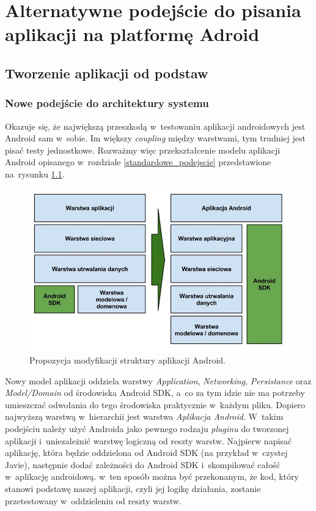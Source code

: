 \chapter{Alternatywne podejście do pisania aplikacji na platformę Adroid}
\label{propozycja_rozwiazania}

\section{Tworzenie aplikacji od podstaw}
\label{nowa_aplikacja}
\subsection{Nowe podejście do architektury systemu}
\label{clean_architecture}
Okazuje się, że największą przeszkodą w~testowaniu aplikacji androidowych jest Android sam w~sobie. Im większy \textit{coupling} między warstwami, tym trudniej jest pisać testy jednostkowe. Rozważmy więc przekształcenie modelu aplikacji Android opisanego w~rozdziale \ref{standardowe_podejscie} przedstawione na~rysunku \ref{fig:opis_rozwiazania}.

\begin{figure}[!htb]
    \centering
    \includegraphics[width=13cm]{imgs/ch4_opis_rozwiazania_1_pl.jpg}
    \caption
{Propozycja modyfikacji struktury aplikacji Android.}
    \label{fig:opis_rozwiazania}
\end{figure} 

Nowy model aplikacji oddziela warstwy \textit{Application}, \textit{Networking}, \textit{Persistance} oraz \textit{Model/Domain} od środowiska Android SDK, a~co za tym idzie nie ma potrzeby umieszczać odwołania do tego środowiska praktycznie w~każdym pliku. Dopiero najwyższą warstwą w~hierarchii jest warstwa \textit{Aplikacja Android}. W~takim podejściu należy użyć Androida jako pewnego rodzaju \textit{pluginu} do tworzonej aplikacji i~uniezależnić warstwę logiczną od reszty warstw. Najpierw napisać aplikację, która będzie oddzielona od Android SDK (na przykład w~czystej Javie), następnie dodać zależności do Android SDK i~skompilować całość w~aplikację androidową. w~ten sposób można być przekonanym, że kod, który stanowi podstawę naszej aplikacji, czyli jej logikę działania, zostanie przetestowany w~oddzieleniu od reszty warstw.

